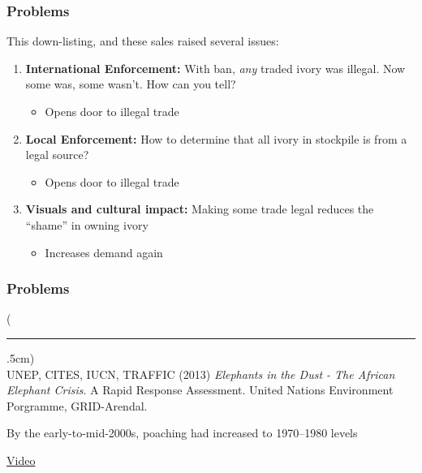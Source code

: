 \documentclass[10pt]{beamer}
\newenvironment{reference}[2]{%
	\begin{textblock*}{\textwidth}(#1,#2)
		\tiny\bgroup\color{gray}}{\egroup\end{textblock*}}
\begin{document}
\begin{frame}[t]
\frametitle{Problems}
\vspace{0.5cm}

	This down-listing, and these sales raised several issues:\\
	
	\medskip
	
		\begin{enumerate}
			\item \textbf{International Enforcement:} With ban, \emph{any} traded ivory was illegal. Now some was, some wasn't. How can you tell?
				\begin{itemize}
					\item Opens door to illegal trade
				\end{itemize}
			\medskip
			\item \textbf{Local Enforcement:} How to determine that all ivory in stockpile is from a legal source?
				\begin{itemize}
					\item Opens door to illegal trade
				\end{itemize}
			\medskip
			\item \textbf{Visuals and cultural impact:} Making some trade legal reduces the ``shame'' in owning ivory
				\begin{itemize}
					\item Increases demand again
				\end{itemize}		
		\end{enumerate}
\end{frame}


\begin{frame}[t]
\frametitle{Problems}
\vspace{0.5cm}
	
	\begin{reference}{4mm}{90mm}
		\rule{1.5cm}{0.25pt}\\
		UNEP, CITES, IUCN, TRAFFIC (2013) \emph{Elephants in the Dust - The African Elephant Crisis}. A Rapid Response Assessment. United Nations Environment Porgramme, GRID-Arendal. 
	\end{reference}
	
	By the early-to-mid-2000s, poaching had increased to 1970--1980 levels\\
	
	\vspace{2cm}
	
	\begin{center}
		\href{https://www.earthtouchnews.com/environmental-crime/poaching/video-a-brief-history-of-the-elephant-ivory-trade/}{\Large{Video}}
	\end{center}
\end{frame}
\end{document}
